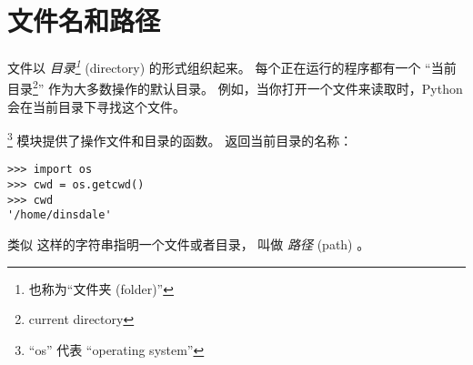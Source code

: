 {{{{{{{%
\section{文件名和路径}
\label{paths}
  
  


文件以 {\em 目录\footnote{也称为``文件夹 (folder)''}} (directory) 的形式组织起来。
每个正在运行的程序都有一个 ``当前目录\footnote{current directory}'' 作为大多数操作的默认目录。
例如，当你打开一个文件来读取时，Python 会在当前目录下寻找这个文件。

  


\footnote{``os'' 代表 ``operating system''} 模块提供了操作文件和目录的函数。  返回当前目录的名称：

  

\begin{lstlisting}
>>> import os
>>> cwd = os.getcwd()
>>> cwd
'/home/dinsdale'
\end{lstlisting}

%

  


类似  这样的字符串指明一个文件或者目录， 叫做 {\em 路径} (path) 。

}}}}}}}
